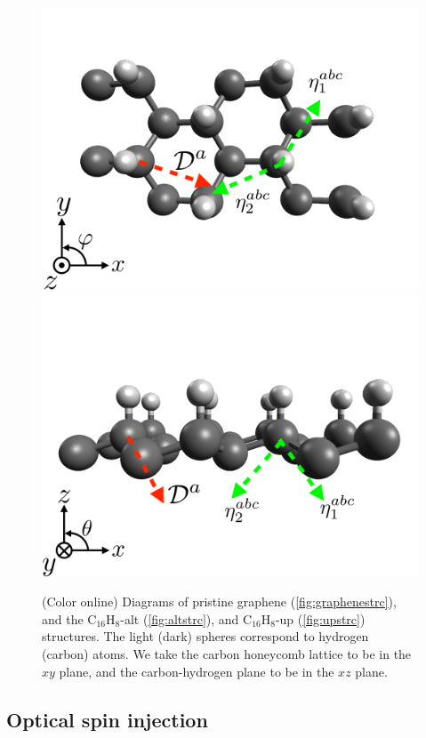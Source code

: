 \documentclass[pss]{wiley2sp} %
\begin{document}
\begin{figure}[t]
{\includegraphics[width=0.49\linewidth]{figures/images/up1}
\includegraphics[width=0.49\linewidth]{figures/images/up2}\label{fig:upstrc}}
\caption{(Color online) Diagrams of pristine graphene
(\ref{fig:graphenestrc}), and the C$_{16}$H$_{8}$-alt (\ref{fig:altstrc}), and
C$_{16}$H$_{8}$-up (\ref{fig:upstrc}) structures. The light (dark) spheres
correspond to hydrogen (carbon) atoms. We take the carbon honeycomb lattice to 
be in the $xy$ plane, and the carbon-hydrogen plane to be in the $xz$
plane.\label{fig:structures}}
\end{figure}



\subsection{Optical spin injection}
\end{document}

